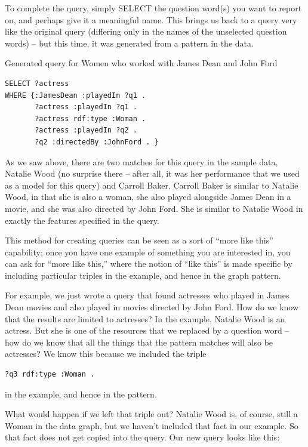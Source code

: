 To complete the query, simply SELECT the question word(s) you want to
report on, and perhaps give it a meaningful name. This brings us back to
a query very like the original query (differing only in the names of the
unselected question words) -- but this time, it was generated from a
pattern in the data.

\begin{query}Generated query for Women who worked with James Dean and John Ford\end{query}
\begin{lstlisting}
SELECT ?actress
WHERE {:JamesDean :playedIn ?q1 .
       ?actress :playedIn ?q1 .
       ?actress rdf:type :Woman .
       ?actress :playedIn ?q2 .
       ?q2 :directedBy :JohnFord . }
\end{lstlisting}


As we saw above, there are two matches for this query in the sample
data, Natalie Wood (no surprise there -- after all, it was her
performance that we used as a model for this query) and Carroll Baker.
Carroll Baker is similar to Natalie Wood, in that she is also a woman,
she also played alongside James Dean in a movie, and she was also
directed by John Ford. She is similar to Natalie Wood in exactly the
features specified in the query.

This method for creating queries can be seen as a sort of ``more like
this'' capability; once you have one example of something you are
interested in, you can ask for ``more like this,'' where the notion of
``like this'' is made specific by including particular triples in the
example, and hence in the graph pattern.

For example, we just wrote a query that found actresses who played in
James Dean movies and also played in movies directed by John Ford. How
do we know that the results are limited to actresses? In the example,
Natalie Wood is an actress. But she is one of the resources that we
replaced by a question word -- how do we know that all the things that
the pattern matches will also be actresses? We know this because we
included the triple

\begin{lstlisting}
?q3 rdf:type :Woman .
\end{lstlisting}

in the example, and hence in the pattern.

What would happen if we left that triple out? Natalie Wood is, of
course, still a Woman in the data graph, but we haven't included that
fact in our example. So that fact does not get copied into the query.
Our new query looks like this:

